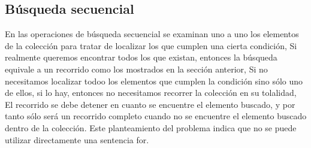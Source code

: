\documentclass[11pt,a4paper]{article}
\begin{document}
  	\subsection{Búsqueda secuencial}
  	En las operaciones de búsqueda secuencial se examinan uno a uno los elementos de la colección para tratar de localizar los que cumplen una cierta
  	condición, Si realmente queremos encontrar todos los que existan, entonces la búsqueda equivale a un recorrido como los mostrados en la sección anterior, Si no necesitamos localizar todoo los elementos que cumplen la condición sino
  	sólo uno de ellos, si lo hay, entonces no necesitamos recorrer la colección en
  	su tolalidad, El recorrido se debe detener en cuanto se encuentre el elemento buscado, y por tanto sólo será un recorrido completo cuando no se encuentre el elemento buscado dentro de la colección. Este planteamiento del problema
  	indica que no se puede utilizar directamente una sentencia for.
\end{document}
